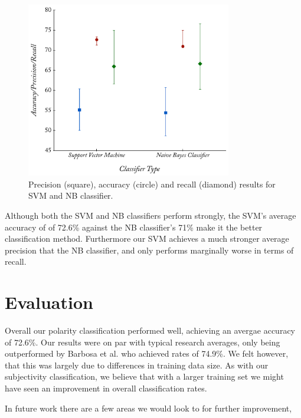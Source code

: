 \begin{figure}
	\caption{Precision (square), accuracy (circle) and recall (diamond) results for SVM and NB classifier.}
	\label{fig:polarity_class}
	\centering
		\includegraphics[width=0.8\textwidth]{graphs/polarity_class.pdf}
\end{figure}

Although both the SVM and NB classifiers perform strongly, the SVM's average accuracy of of 72.6\% against the NB classifier's 71\% make it the better classification method. Furthermore our SVM achieves a much stronger average precision that the NB classifier, and only performs marginally worse in terms of recall.

\section{Evaluation}

Overall our polarity classification performed well, achieving an avergae accuracy of 72.6\%. Our results were on par with typical research averages, only being outperformed by Barbosa et al. \cite{Barbosa:ws} who achieved rates of 74.9\%. We felt however, that this was largely due to differences in training data size. As with our subjectivity classification, we believe that with a larger training set we might have seen an improvement in overall classification rates.

In future work there are a few areas we would look to for further improvement,

